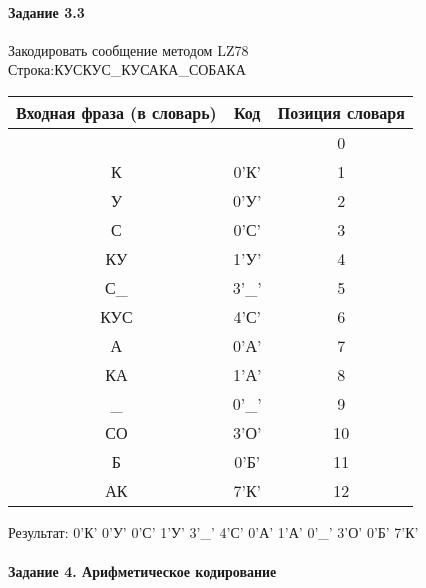 \documentclass[a4paper, 12pt]{article}
\begin{document}
\paragraph{Задание 3.3}

Закодировать сообщение методом LZ78\\
Строка:КУСКУС\_КУСАКА\_СОБАКА\\
\begin{table}[h!]
\centering
\begin{tabular}{|c|c|c|} 
\hline
 Входная фраза (в словарь) & Код & Позиция словаря \\ \hline

 &  & 0 \\ \hline
К & 0'К' & 1 \\ \hline
У & 0'У' & 2 \\ \hline
С & 0'С' & 3 \\ \hline
КУ & 1'У' & 4 \\ \hline
С\_ & 3'\_' & 5 \\ \hline
КУС & 4'С' & 6 \\ \hline
А & 0'А' & 7 \\ \hline
КА & 1'А' & 8 \\ \hline
\_ & 0'\_' & 9 \\ \hline
СО & 3'О' & 10 \\ \hline
Б & 0'Б' & 11 \\ \hline
АК & 7'К' & 12 \\ \hline
\end{tabular}
\end{table}

Результат: 0'К' 0'У' 0'С' 1'У' 3'\_' 4'С' 0'А' 1'А' 0'\_' 3'О' 0'Б' 7'К'\\
\pagebreak
\paragraph{Задание 4. Арифметическое кодирование\\}
\end{document}
